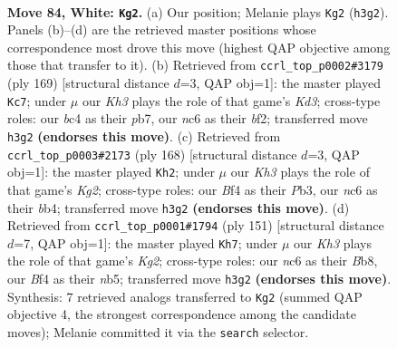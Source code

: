 \documentclass[11pt]{article}
\begin{document}
\clearpage

\begin{figure}[p]\centering
\begin{subfigure}{0.46\textwidth}\centering
\resizebox{\linewidth}{!}{%
\newchessgame
\chessboard[
  setfen={8/7k/2n5/8/2b2B2/7K/5P2/8 w - - 13 84},
  showmover=false,
  pgfstyle=straightmove, color=movearrow, markmove={h3-g2}
]}
\caption{}
\end{subfigure}\hfill
\begin{subfigure}{0.46\textwidth}\centering
\resizebox{\linewidth}{!}{%
\newchessgame
\chessboard[
  setfen={8/1P5p/3k3b/8/6K1/8/5B2/8 b - - 0 85},
  showmover=false,
  pgfstyle=straightmove, color=movearrow, markmove={d6-c7}
]}
\caption{}
\end{subfigure}
\\[4pt]
\begin{subfigure}{0.46\textwidth}\centering
\resizebox{\linewidth}{!}{%
\newchessgame
\chessboard[
  setfen={4B3/8/8/6n1/1b1k4/1P6/6K1/8 w - - 14 85},
  showmover=false,
  pgfstyle=straightmove, color=movearrow, markmove={g2-h2}
]}
\caption{}
\end{subfigure}\hfill
\begin{subfigure}{0.46\textwidth}\centering
\resizebox{\linewidth}{!}{%
\newchessgame
\chessboard[
  setfen={1b6/6k1/8/1N6/2K4p/7B/8/8 b - - 18 76},
  showmover=false,
  pgfstyle=straightmove, color=movearrow, markmove={g7-h7}
]}
\caption{}
\end{subfigure}
\caption{\textbf{Move 84, White: \texttt{Kg2}.} (a) Our position; Melanie plays \texttt{Kg2} (\texttt{h3g2}). Panels (b)--(d) are the retrieved master positions whose correspondence most drove this move (highest QAP objective among those that transfer to it). (b) Retrieved from \texttt{ccrl\_top\_p0002\#3179} (ply 169) [structural distance $d$=3, QAP obj=1]: the master played \texttt{Kc7}; under $\mu$ our \emph{Kh3} plays the role of that game's \emph{Kd3}; cross-type roles: our \emph{b}c4 as their \emph{p}b7, our \emph{n}c6 as their \emph{b}f2; transferred move \texttt{h3g2} \textbf{(endorses this move)}. (c) Retrieved from \texttt{ccrl\_top\_p0003\#2173} (ply 168) [structural distance $d$=3, QAP obj=1]: the master played \texttt{Kh2}; under $\mu$ our \emph{Kh3} plays the role of that game's \emph{Kg2}; cross-type roles: our \emph{B}f4 as their \emph{P}b3, our \emph{n}c6 as their \emph{b}b4; transferred move \texttt{h3g2} \textbf{(endorses this move)}. (d) Retrieved from \texttt{ccrl\_top\_p0001\#1794} (ply 151) [structural distance $d$=7, QAP obj=1]: the master played \texttt{Kh7}; under $\mu$ our \emph{Kh3} plays the role of that game's \emph{Kg2}; cross-type roles: our \emph{n}c6 as their \emph{B}b8, our \emph{B}f4 as their \emph{n}b5; transferred move \texttt{h3g2} \textbf{(endorses this move)}. Synthesis: 7 retrieved analogs transferred to \texttt{Kg2} (summed QAP objective 4, the strongest correspondence among the candidate moves); Melanie committed it via the \texttt{search} selector.}
\label{fig:thought-m166}
\end{figure}
\end{document}
